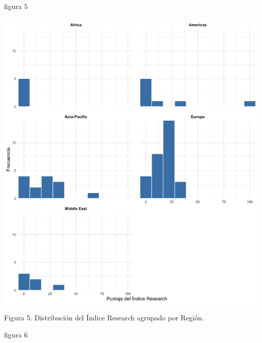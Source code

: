 \documentclass[
]{article}
\begin{document}
\begin{multicols}{2}

figura 5



\begin{center}
\includegraphics[width=\linewidth]{figura5.png}
\end{center}
Figura 5. Distribución del Índice Research agrupado por Región.

figura 6




\end{multicols}
\end{document}
